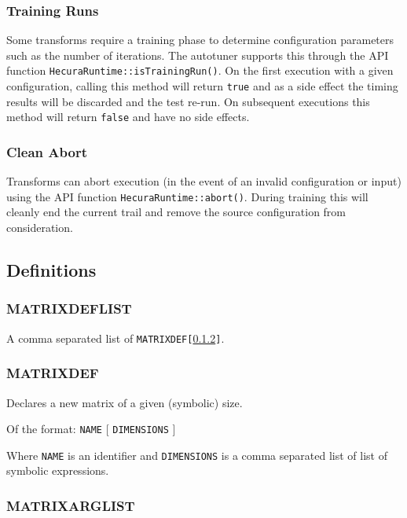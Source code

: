 \documentclass[11pt]{article}
\begin{document}
\subsubsection{Training Runs}

Some transforms require a training phase to determine configuration parameters
such as the number of iterations.  The autotuner supports this through the
API function {\tt HecuraRuntime::isTrainingRun()}.  On the first execution
with a given configuration, calling this method will return {\tt true} and
as a side effect the timing results will be discarded and the test re-run.
On subsequent executions this method will return {\tt false} and have no
side effects.

\subsubsection{Clean Abort}

Transforms can abort execution (in the event of an invalid configuration or
input) using the API function {\tt HecuraRuntime::abort()}.  During training
this will cleanly end the current trail and remove the source configuration
from consideration.

\subsection{Definitions}
\subsubsection{MATRIXDEFLIST}
\label{MATRIXDEFLIST}
 
A comma separated list of {\tt MATRIXDEF[\ref{MATRIXDEF}]}.

\subsubsection{MATRIXDEF}
\label{MATRIXDEF}

Declares a new matrix of a given (symbolic) size.

Of the format: {\tt NAME} [ {\tt DIMENSIONS} ] 

Where {\tt NAME} is an identifier and {\tt DIMENSIONS} is a comma separated
list of list of symbolic expressions.

\subsubsection{MATRIXARGLIST}
\label{MATRIXARGLIST}
\end{document}
